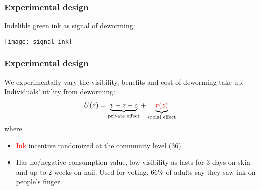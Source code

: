 \documentclass{beamer}
\theoremstyle{plain}
\begin{document}
\begin{frame}[label=slide15]
\frametitle{\large{Experimental design}}
Indelible green ink as signal of deworming:
\begin{center}
\texttt{[image: signal\_ink]}
\end{center}
\end{frame}


\begin{frame}[label=slide14]
\frametitle{\large{Experimental design}}
We experimentally vary the visibility, benefits and cost of deworming take-up. Individuals' utility from deworming:
\bigskip
\begin{align}
U(z) = \underbrace{v + z - c}_{\text{private effect}} + \underbrace{\textcolor{red}{r(z)}}_{\text{social effect}}  \nonumber   
\end{align} 
where 
\begin{itemize}
\item \textcolor{red}{Ink} incentive randomized at the community level (36).
\item Has no/negative consumption value, low visibility as lasts for 3 days on skin and up to 2 weeks on nail. Used for voting.  66$\%$ of adults say they saw ink on people's finger.
\end{itemize}
\end{frame}
\end{document}
